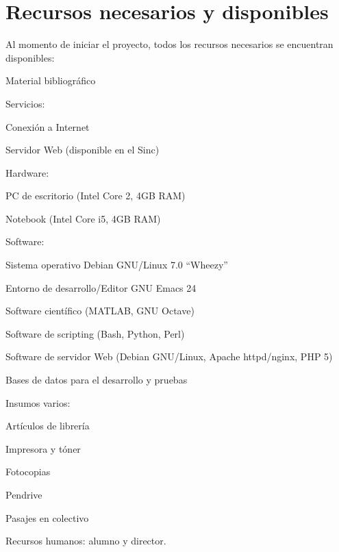 \documentclass[12pt,bibliography=oldstyle,DIV=12,parskip=full-]{scrartcl}
\begin{document}
\section{Recursos necesarios y disponibles}
Al momento de iniciar el proyecto, todos los recursos necesarios se
encuentran disponibles:
\begin{itemize*}
\item Material bibliográfico
\item Servicios:
  \begin{itemize*}
  \item Conexión a Internet
  \item Servidor Web (disponible en el Sinc)
  \end{itemize*}
\item Hardware:
  \begin{itemize*}
  \item PC de escritorio (Intel Core 2, 4GB RAM)
  \item Notebook (Intel Core i5, 4GB RAM)
  \end{itemize*}
\item Software:
  \begin{itemize*}
  \item Sistema operativo Debian GNU/Linux 7.0 ``Wheezy''
  \item Entorno de desarrollo/Editor GNU Emacs 24
  \item Software científico (MATLAB, GNU Octave)
  \item Software de scripting (Bash, Python, Perl)
  \item Software de servidor Web (Debian GNU/Linux, Apache
    httpd/nginx, PHP 5)
  \end{itemize*}
\item Bases de datos para el desarrollo y pruebas
\item Insumos varios:
  \begin{itemize*}
  \item Artículos de librería
  \item Impresora y tóner
  \item Fotocopias
  \item Pendrive
  \item Pasajes en colectivo
  \end{itemize*}
\item Recursos humanos: alumno y director.
\end{itemize*}
%
%
\newpage
\end{document}
